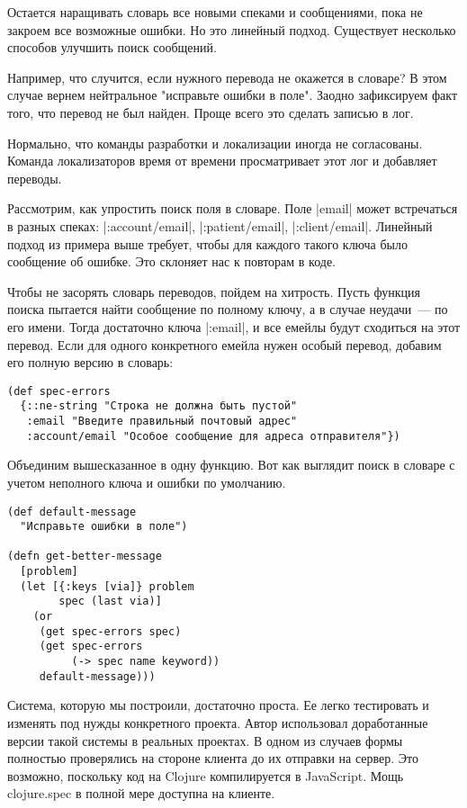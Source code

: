 Остается наращивать словарь все новыми спеками и сообщениями, пока не закроем
все возможные ошибки. Но это линейный подход. Существует несколько способов
улучшить поиск сообщений.

Например, что случится, если нужного перевода не окажется в словаре? В этом
случае вернем нейтральное "исправьте ошибки в поле". Заодно зафиксируем факт
того, что перевод не был найден. Проще всего это сделать записью в лог.

Нормально, что команды разработки и локализации иногда не согласованы. Команда
локализаторов время от времени просматривает этот лог и добавляет переводы.

Рассмотрим, как упростить поиск поля в словаре. Поле \spverb|email| может встречаться в
разных спеках: \spverb|:account/email|, \spverb|:patient/email|, \spverb|:client/email|. Линейный
подход из примера выше требует, чтобы для каждого такого ключа было сообщение об
ошибке. Это склоняет нас к повторам в коде.

Чтобы не засорять словарь переводов, пойдем на хитрость. Пусть функция поиска
пытается найти сообщение по полному ключу, а в случае неудачи~--- по его
имени. Тогда достаточно ключа \spverb|:email|, и все емейлы будут сходиться на этот
перевод. Если для одного конкретного емейла нужен особый перевод, добавим его
полную версию в словарь:

\begin{verbatim}
(def spec-errors
  {::ne-string "Строка не должна быть пустой"
   :email "Введите правильный почтовый адрес"
   :account/email "Особое сообщение для адреса отправителя"})
\end{verbatim}

Объединим вышесказанное в одну функцию. Вот как выглядит поиск в словаре с
учетом неполного ключа и ошибки по умолчанию.

\begin{verbatim}
(def default-message
  "Исправьте ошибки в поле")

(defn get-better-message
  [problem]
  (let [{:keys [via]} problem
        spec (last via)]
    (or
     (get spec-errors spec)
     (get spec-errors
          (-> spec name keyword))
     default-message)))
\end{verbatim}

Система, которую мы построили, достаточно проста. Ее легко тестировать и
изменять под нужды конкретного проекта. Автор использовал доработанные версии
такой системы в реальных проектах. В одном из случаев формы полностью
проверялись на стороне клиента до их отправки на сервер. Это возможно, поскольку
код на Clojure компилируется в JavaScript. Мощь clojure.spec в полной мере
доступна на клиенте.

